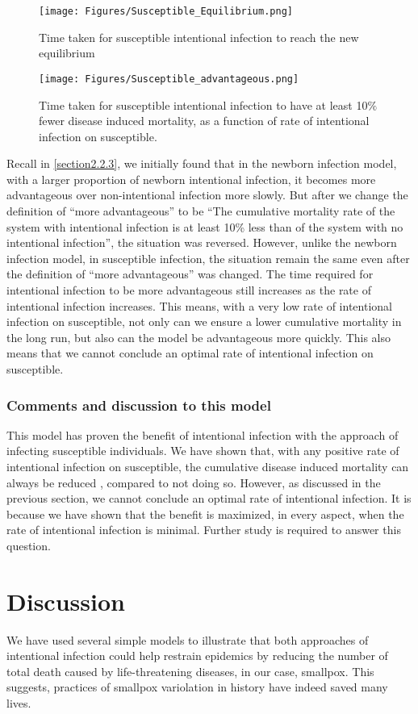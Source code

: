 \documentclass[12pt]{article}
\begin{document}
\begin{figure}[H]
  \centering
  \texttt{[image: Figures/Susceptible\_Equilibrium.png]}
  \caption{Time taken for susceptible intentional infection to reach the new equilibrium}
\end{figure}

\begin{figure}[H]
  \centering
  \texttt{[image: Figures/Susceptible\_advantageous.png]}
  \caption{Time taken for susceptible intentional infection to have at least 10$\%$ fewer disease induced mortality, as a function of rate of intentional infection on susceptible.}
\end{figure}

Recall in \autoref{section2.2.3}, we initially found that in the newborn infection model, with a larger proportion of newborn intentional infection, it becomes more advantageous over non-intentional infection more slowly. But after we change the definition of ``more advantageous'' to be ``The cumulative mortality rate of the system with intentional infection is at least 10\% less than of the system with no intentional infection'', the situation was reversed. However, unlike the newborn infection model, in susceptible infection, the situation remain the same even after the definition of ``more advantageous'' was changed. The time required for intentional infection to be more advantageous still increases as the rate of intentional infection increases. This means, with a very low rate of intentional infection on susceptible, not only can we ensure a lower cumulative mortality in the long run, but also can the model be advantageous more quickly. This also means that we cannot conclude an optimal rate of intentional infection on susceptible.
\subsubsection{Comments and discussion to this model}
This model has proven the benefit of intentional infection with the approach of infecting susceptible individuals. We have shown that, with any positive rate of intentional infection on susceptible, the cumulative disease induced mortality can always be reduced , compared to not doing so. However, as discussed in the previous section, we cannot conclude an optimal rate of intentional infection. It is because we have shown that the benefit is maximized, in every aspect, when the rate of intentional infection is minimal. Further study is required to answer this question.
\section{Discussion}
We have used several simple models to illustrate that both approaches of intentional infection could help restrain epidemics by reducing the number of total death caused by life-threatening diseases, in our case, smallpox. This suggests, practices of smallpox variolation in history have indeed saved many lives. 
\end{document}
